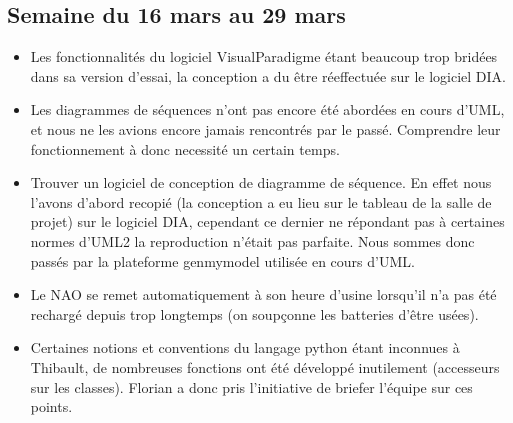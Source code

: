   \subsection{Semaine du 16 mars au 29 mars}
  \label{sub:Semaine du 16 mars au 29 mars}
    \begin{itemize}
      \item Les fonctionnalités du logiciel VisualParadigme étant beaucoup trop bridées dans sa version d'essai, la conception a du être réeffectuée sur le logiciel DIA.
      \item Les diagrammes de séquences n'ont pas encore été abordées en cours d'UML, et nous ne les avions encore jamais rencontrés par le passé.
      Comprendre leur fonctionnement à donc necessité un certain temps.
      \item Trouver un logiciel de conception de diagramme de séquence.
      En effet nous l’avons d’abord recopié (la conception a eu lieu sur le tableau de la salle de projet) sur le logiciel DIA,
      cependant ce dernier ne répondant pas à certaines normes d’UML2 la reproduction n’était pas parfaite.
      Nous sommes donc passés par la plateforme genmymodel utilisée en cours d’UML.
      \item Le NAO se remet automatiquement à son heure d’usine lorsqu’il n’a pas été rechargé depuis trop longtemps (on soupçonne les batteries d’être usées).
      \item Certaines notions et conventions du langage python étant inconnues à Thibault, de nombreuses fonctions ont été développé inutilement (accesseurs sur les classes).
      Florian a donc pris l’initiative de briefer l’équipe sur ces points.\\
    \end{itemize}




